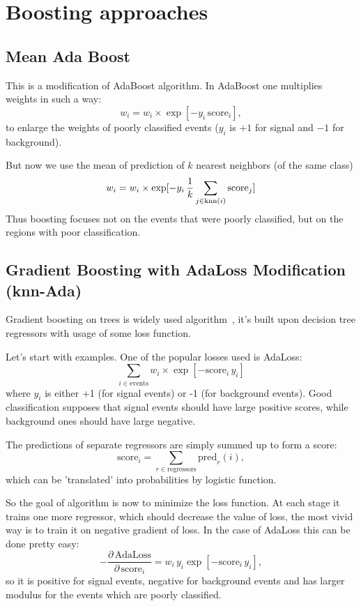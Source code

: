 \section{Boosting approaches}
\subsection{Mean Ada Boost}

This is a modification of AdaBoost algorithm. In AdaBoost one multiplies weights in such a way:
\[
	w_i = w_i \times \exp[-y_i \, \text{score}_i],
\]
to enlarge the weights of poorly classified events ($y_i$ is $+1$ for signal and $-1$ for background).

But now we use the mean of prediction of $k$ nearest neighbors (of the same class)
\[
	w_i = w_i \times \exp[-y_i \, \dfrac{1}{k} \sum_{j \in \text{knn}(i)} \text{score}_j]
\]
Thus boosting focuses not on the events that were poorly classified, but on the regions with poor classification.


\subsection{Gradient Boosting with AdaLoss Modification (knn-Ada)}

\def\score{\text{score}}
\def\knn{\text{knn}}
\def\FL{\text{FL}}

Gradient boosting on trees is widely used algorithm~\cite{ref:F1999}, it's built upon decision tree regressors with usage of some loss function. 

Let's start with examples. One of the popular losses used is AdaLoss:
\[
	\sum_{i \in \text{events}} w_i \times \exp [- \score_i \, y_i] 
\]
where $y_i$ is either +1 (for signal events) or -1 (for background events). Good classification supposes that signal events should have large positive scores, while background ones should have large negative.

The predictions of separate regressors are simply summed up to form a score:
\[
	\score_i = \sum_{r \in \text{regressors}} \text{pred}_r(i),
\]
which can be 'translated' into probabilities by logistic function.

So the goal of algorithm is now to minimize the loss function. At each stage it trains one more regressor, which should decrease the value of loss, the most vivid way is to train it on negative gradient of loss. In the case of AdaLoss this can be done pretty easy:
\[
	-\dfrac{\partial \, \text{AdaLoss}}{\partial \, \score_i} = w_i \, y_i \exp[- \score_i \, y_i],
\]
so it is positive for signal events, negative for background events and has larger modulus for the events which are poorly classified.


